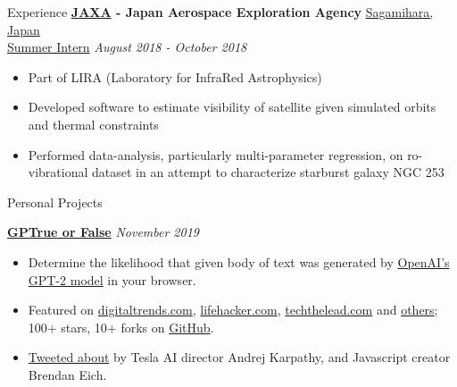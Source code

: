 \documentclass{resume} %
\begin{document}
\begin{rSection}{Experience}
	{\bf \href{https://global.jaxa.jp/}{JAXA} -  Japan Aerospace Exploration Agency} \hfill \underline{Sagamihara, Japan}
	\\ \underline{Summer Intern} \hfill {\em August 2018 - October 2018}
	\begin{itemize}\vspace{-0.5em}
		\item Part of LIRA (Laboratory for InfraRed Astrophysics)
		\item Developed software to estimate visibility of satellite given simulated orbits and thermal constraints
		\item Performed data-analysis, particularly multi-parameter regression, on ro-vibrational dataset in an attempt to characterize starburst galaxy NGC 253
	\end{itemize}
\end{rSection}

\begin{rSection}{Personal Projects}

	{\bf \href{https://chrome.google.com/webstore/search/Gptrue%20or%20false}{GPTrue or False}}  \hfill {\em November 2019}
	\begin{itemize}\vspace{-0.5em}
		\item Determine the likelihood that given body of text was generated by \href{https://openai.com/blog/better-language-models/}{OpenAI's GPT-2 model} in your browser.
		\item Featured on \href{https://www.digitaltrends.com/cool-tech/gpt-2-plugin-sorts-real-from-fake/}{digitaltrends.com}, \href{https://lifehacker.com/automatically-detect-computer-generated-text-with-this-1839942470}{lifehacker.com}, \href{https://techthelead.com/chrome-extension-tells-you-who-wrote-that-text-computer-or-human/}{techthelead.com} and \href{https://news.google.com/search?q=gptrue+or+false&hl=en-US&gl=US&ceid=US:en}{others}; 100+ stars, 10+ forks on \href{https://github.com/thesofakillers/GPTrue-or-False}{GitHub}.
		\item \href{https://twitter.com/BrendanEich/status/1196507724072095744?s=20}{Tweeted about} by Tesla AI director Andrej Karpathy, and Javascript creator Brendan Eich.
	\end{itemize}
\end{rSection}
\end{document}
